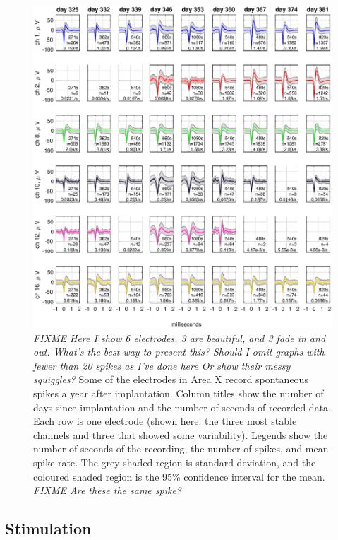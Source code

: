 \documentclass[10pt,letterpaper]{article}
\begin{document}
\begin{figure}
  \includegraphics[width=\textwidth]{XSpikeRecording}
  \caption{{\em FIXME Here I show 6 electrodes.  3 are beautiful, and
      3 fade in and out.  What's the best way to present this?  Should
      I omit graphs with fewer than 20 spikes as I've done here Or
      show their messy squiggles?}  Some of the electrodes in Area X
    record spontaneous spikes a year after implantation.  Column
    titles show the number of days since implantation and the number of seconds of
    recorded data.  Each row is one electrode (shown here: the three
    most stable channels and three that showed some variability).
    Legends show the number of seconds of the recording, the number of
    spikes, and mean spike rate.  The grey shaded region is standard
    deviation, and the coloured shaded region is the 95\% confidence
    interval for the mean. {\em FIXME Are these the same spike?}}
  \label{fig:XSpikeRecording}
\end{figure}




\subsection{Stimulation}
\end{document}
